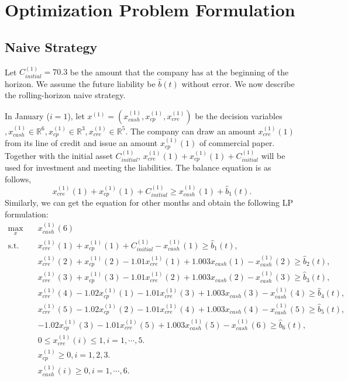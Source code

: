 
\section{Optimization Problem Formulation}\label{apx:problemFormulation}

\subsection{Naive Strategy}

    Let $C^{(1)}_{initial} = 70.3$ be the amount that the company has at the beginning of the horizon. We assume the future liability be $\hat{b}(t)$ without error. We now describe the rolling-horizon naive strategy.
    
    In January ($i = 1$), let $x^{(1)}=(x^{(1)}_{cash}, x^{(1)}_{cp}, x^{(1)}_{cre})$ be the decision variables $, x^{(1)}_{cash}\in\mathbb{R}^6, x^{(1)}_{cp}\in\mathbb{R}^3, x^{(1)}_{cre}\in\mathbb{R}^5$. The company can draw an amount $x^{(1)}_{cre}(1)$ from its line of credit and issue an amount $x^{(1)}_{cp}(1)$ of commercial paper. Together with the initial asset $C^{(1)}_{initial}$, $x^{(1)}_{cre}(1)+x^{(1)}_{cp}(1)+C^{(1)}_{initial}$ will be used for investment and meeting the liabilities. The balance equation is as follows, 
    \[
        x^{(1)}_{cre}(1)+x^{(1)}_{cp}(1)+C^{(1)}_{initial}\geq x^{(1)}_{cash}(1) + \hat{b}_1(t).
    \]
    Similarly, we can get the equation for other months and obtain the following LP formulation:
    \[
        \begin{split}
            \max_{x} \quad & x^{(1)}_{cash}(6) \\
            \text{s.t.} \quad 
            & x^{(1)}_{cre}(1) + x^{(1)}_{cp}(1)+C^{(1)}_{initial}-x^{(1)}_{cash}(1) \geq \hat{b}_1(t), \\
            & x^{(1)}_{cre}(2) + x^{(1)}_{cp}(2) -1.01x^{(1)}_{cre}(1) + 1.003x_{cash}(1) -x^{(1)}_{cash}(2) \geq \hat{b}_2(t),  \\
            & x^{(1)}_{cre}(3) + x^{(1)}_{cp}(3) -1.01x^{(1)}_{cre}(2) + 1.003x_{cash}(2) -x^{(1)}_{cash}(3) \geq \hat{b}_3(t),  \\
            & x^{(1)}_{cre}(4) - 1.02x^{(1)}_{cp}(1) - 1.01x^{(1)}_{cre}(3) + 1.003x_{cash}(3) - x^{(1)}_{cash}(4) \geq \hat{b}_4(t),  \\
            & x^{(1)}_{cre}(5) - 1.02x^{(1)}_{cp}(2) - 1.01x^{(1)}_{cre}(4) + 1.003x_{cash}(4) - x^{(1)}_{cash}(5) \geq \hat{b}_5(t),  \\
            & - 1.02x^{(1)}_{cp}(3) - 1.01x^{(1)}_{cre}(5) + 1.003x^{(1)}_{cash}(5) - x^{(1)}_{cash}(6) \geq \hat{b}_6(t),  \\
            & 0 \leq x^{(1)}_{cre}(i) \leq 1, i = 1, \cdots, 5.\\
            & x^{(1)}_{cp} \geq 0, i = 1, 2, 3.\\
            & x^{(1)}_{cash}(i)\geq 0, i = 1, \cdots, 6.
        \end{split}
    \]
